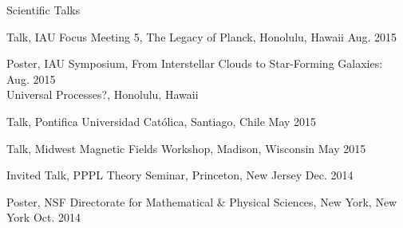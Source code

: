 \documentclass{resume_clark} %
\newcommand{\hi}{H{\sc i}~}
\begin{document}
\begin{rSection}{Scientific Talks}
\begin{etaremune}[itemsep=-1.8mm]
\item Talk, IAU Focus Meeting 5, The Legacy of Planck, Honolulu, Hawaii \hfill {Aug. 2015}

\item Poster, IAU Symposium, From Interstellar Clouds to Star-Forming Galaxies: \hfill {Aug. 2015}\\Universal Processes?, Honolulu, Hawaii

\item Talk, Pontifica Universidad Cat\'olica, Santiago, Chile \hfill {May 2015}

\item Talk, Midwest Magnetic Fields Workshop, Madison, Wisconsin \hfill {May 2015}

\item Invited Talk, PPPL Theory Seminar, Princeton, New Jersey \hfill {Dec. 2014}

\item Poster, NSF Directorate for Mathematical \& Physical Sciences, New York, New York \hfill {Oct. 2014}


\end{etaremune}
\end{rSection}
\end{document}
